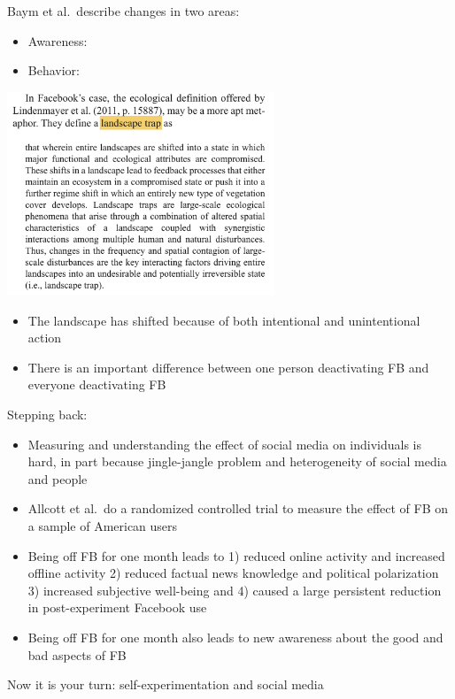 \documentclass[aspectratio=169]{beamer}
\begin{document}
\begin{frame}

Baym et al.\ describe changes in two areas:
\begin{itemize}
\item Awareness: 
\item Behavior: 
\end{itemize}

\end{frame}
\begin{frame}

\begin{center}
\includegraphics[width=0.6\textwidth]{figures/baym_mindfully_2020_landscape_trap}
\end{center}

\vfill 
\begin{itemize}
\item The landscape has shifted because of both intentional and unintentional action \pause
\item There is an important difference between one person deactivating FB and everyone deactivating FB
\end{itemize}


\end{frame}
\begin{frame}

Stepping back:
\begin{itemize}
\item Measuring and understanding the effect of social media on individuals is hard, in part because jingle-jangle problem and heterogeneity of social media and people \pause
\item Allcott et al.\ do a randomized controlled trial to measure the effect of FB on a sample of American users \pause
\item Being off FB for one month leads to 1) reduced online activity and increased offline activity 2) reduced factual news knowledge and political polarization 3) increased subjective well-being and 4) caused a large persistent reduction in post-experiment Facebook use \pause
\item Being off FB for one month also leads to new awareness about the good and bad aspects of FB 
\end{itemize}

\end{frame}
\begin{frame}

Now it is your turn: self-experimentation and social media

\end{frame}
\end{document}

